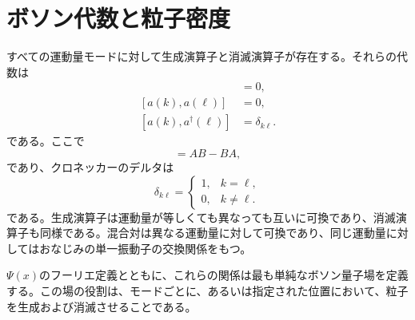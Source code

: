 \section{ボソン代数と粒子密度}

すべての運動量モードに対して生成演算子と消滅演算子が存在する。それらの代数は
\begin{align}
[a^\dagger(k),a^\dagger(\ell)]&=0,\\
[a(k),a(\ell)]&=0,\\
[a(k),a^\dagger(\ell)]&=\delta_{k\ell}.
\end{align}
である。ここで
\begin{equation}
[A,B]=AB-BA,
\end{equation}
であり、クロネッカーのデルタは
\begin{equation}
\delta_{k\ell}=
\begin{cases}
1,&k=\ell,\\
0,&k\ne\ell.
\end{cases}
\end{equation}
である。生成演算子は運動量が等しくても異なっても互いに可換であり、消滅演算子も同様である。混合対は異なる運動量に対して可換であり、同じ運動量に対してはおなじみの単一振動子の交換関係をもつ。

\(\Psi(x)\)のフーリエ定義とともに、これらの関係は最も単純なボソン量子場を定義する。この場の役割は、モードごとに、あるいは指定された位置において、粒子を生成および消滅させることである。


